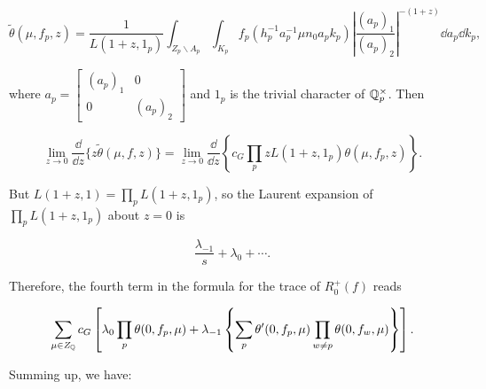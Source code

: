 \[
\tilde{\theta}(\mu, f_p, z) = \frac{1}{L(1 + z, 1_p)}\int_{Z_p \backslash A_p}\int_{K_p} f_p(h_p^{-1}a_p^{-1}\mu n_0a_pk_p)\left|\frac{(a_p)_1}{(a_p)_2}\right|^{-(1+z)}\dd a_p\dd k_p,
\]

where $a_p = \begin{bmatrix} (a_p)_1 & 0 \\ 0 & (a_p)_2 \end{bmatrix}$ and $1_p$ is the trivial character of $\mathbb{Q}_p^{\times}$. Then

\[
\lim_{z \to 0}\frac{\dd}{\dd z}\{z\tilde{\theta}(\mu, f, z)\} = \lim_{z \to 0}\frac{\dd}{\dd z}\left\{c_G\prod_p zL(1 + z, 1_p)\theta(\mu, f_p, z)\right\}.
\]

But $L(1 + z, 1) = \prod_p L(1 + z, 1_p)$, so the Laurent expansion of $\prod_p L(1 + z, 1_p)$ about $z = 0$ is

\[
\frac{\lambda_{-1}}{s} + \lambda_0 + \cdots .
\]

Therefore, the fourth term in the formula for the trace of $R_0^{+}(f)$ reads

\[
\sum_{\mu \in Z_{\mathbb{Q}}}c_G\left[\lambda_0\prod_p\theta(0, f_p, \mu) + \lambda_{-1}\left\{\sum_p \theta'(0, f_p, \mu)\prod_{w \neq p}\theta(0, f_w, \mu)\right\}\right].
\]

Summing up, we have:

